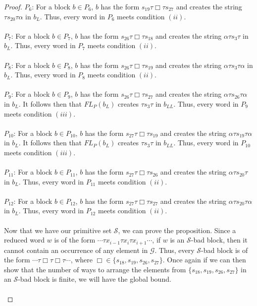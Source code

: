 \documentclass[11pt]{amsart}
\theoremstyle{definition}
\theoremstyle{remark}
\numberwithin{equation}{section}
\begin{document}
\begin{proof}
\underline{$P_{6}$}: For a block $b \in P_{6}$, $b$ has the form $s_{19} \tau \Box \tau s_{27}$ and creates the string $\tau s_{20} \tau \alpha$ in $b_{L}$. Thus, every word in $P_{6}$ meets condition $(ii)$. \\ \\
\underline{$P_{7}$}: For a block $b \in P_{7}$, $b$ has the form $s_{26} \tau \Box \tau s_{18}$ and creates the string $\alpha \tau s_{3} \tau$ in $b_{L}$. Thus, every word in $P_{7}$ meets condition $(ii)$. \\ \\
\underline{$P_{8}$}: For a block $b \in P_{8}$, $b$ has the form $s_{26} \tau \Box \tau s_{19}$ and creates the string $\alpha \tau s_{3} \tau \alpha$ in $b_{L}$. Thus, every word in $P_{8}$ meets condition $(ii)$. \\ \\
\underline{$P_{9}$}: For a block $b \in P_{9}$, $b$ has the form $s_{26} \tau \Box \tau s_{27}$ and creates the string $\alpha \tau s_{26} \tau \alpha$ in $b_{L}$. It follows then that $FL_{P}(b_{L})$ creates $\tau s_{3} \tau$ in $b_{LL}$. Thus, every word in $P_{9}$ meets condition $(iii)$. \\ \\
\underline{$P_{10}$}: For a block $b \in P_{10}$, $b$ has the form $s_{27} \tau \Box \tau s_{19}$ and creates the string $\alpha \tau s_{19} \tau \alpha$ in $b_{L}$. It follows then that $FL_{P}(b_{L})$ creates $\tau s_{3} \tau$ in $b_{LL}$. Thus, every word in $P_{10}$ meets condition $(iii)$. \\ \\
\underline{$P_{11}$}: For a block $b \in P_{11}$, $b$ has the form $s_{27} \tau \Box \tau s_{26}$ and creates the string $\alpha \tau s_{20} \tau$ in $b_{L}$. Thus, every word in $P_{11}$ meets condition $(ii)$. \\ \\
\underline{$P_{12}$}: For a block $b \in P_{12}$, $b$ has the form $s_{27} \tau \Box \tau s_{27}$ and creates the string $\alpha \tau s_{20} \tau \alpha$ in $b_{L}$. Thus, every word in $P_{12}$ meets condition $(ii)$. \\ \\
Now that we have our primitive set $\mathcal{S}$, we can prove the proposition. Since a reduced word $w$ is of the form $\cdots \tau x_{i-1} \tau x_{i} \tau x_{i+1} \cdots$, if $w$ is an $\mathcal{S}$-bad block, then it cannot contain an occurrence of any element in $\mathcal{G}$. Thus, every $\mathcal{S}$-bad block is of the form $\cdots \tau \Box \tau \Box \tau \cdots$, where $\Box \in \{ s_{18}, s_{19}, s_{26}, s_{27} \}$. Once again if we can then show that the number of ways to arrange the elements from $\{ s_{18}, s_{19}, s_{26}, s_{27} \}$ in an $\mathcal{S}$-bad block is finite, we will have the global bound.  \\ \\

\end{proof}
\end{document}
